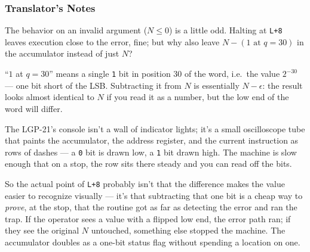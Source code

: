 \subsubsection*{Translator's Notes}
The behavior on an invalid argument ($N \le 0$) is a little odd. Halting at \texttt{L+8} leaves execution close to the error, fine; but why also leave $N - (1 \text{ at } q=30)$ in the accumulator instead of just $N$?

``$1$ at $q=30$'' means a single \texttt{1} bit in position 30 of the word, i.e.\ the value $2^{-30}$ --- one bit short of the LSB. Subtracting it from $N$ is essentially $N - \epsilon$: the result looks almost identical to $N$ if you read it as a number, but the low end of the word will differ.

The LGP-21's console isn't a wall of indicator lights; it's a small oscilloscope tube that paints the accumulator, the address register, and the current instruction as rows of dashes --- a \texttt{0} bit is drawn low, a \texttt{1} bit drawn high. The machine is slow enough that on a stop, the row sits there steady and you can read off the bits.

So the actual point of \texttt{L+8} probably isn't that the difference makes the value easier to recognize visually --- it's that subtracting that one bit is a cheap way to \emph{prove}, at the stop, that the routine got as far as detecting the error and ran the trap. If the operator sees a value with a flipped low end, the error path ran; if they see the original $N$ untouched, something else stopped the machine. The accumulator doubles as a one-bit status flag without spending a location on one.
\newpage
